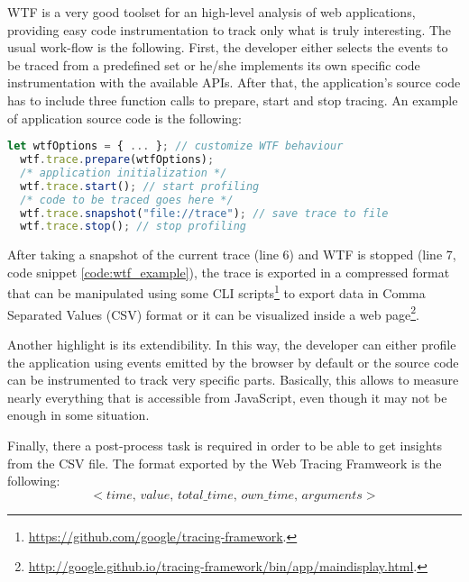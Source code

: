 WTF is a very good toolset for an high-level analysis of web applications,
providing easy code instrumentation to track only what is truly interesting.
The usual work-flow is the following. First, the developer either selects the events
to be traced from a predefined set or he/she implements its own specific code
instrumentation with the available APIs. After that, the application's source code
has to include three function calls to prepare, start and stop tracing.
An example of application source code is the following:
\begin{lstlisting}[caption=Usage example of the Web Tracing Framework., language=JavaScript,
  label=code:wtf_example]
  let wtfOptions = { ... }; // customize WTF behaviour
  wtf.trace.prepare(wtfOptions);
  /* application initialization */
  wtf.trace.start(); // start profiling
  /* code to be traced goes here */
  wtf.trace.snapshot("file://trace"); // save trace to file
  wtf.trace.stop(); // stop profiling
\end{lstlisting}

After taking a snapshot of the current trace (line 6) and WTF is stopped (line 7,
code snippet \ref{code:wtf_example}), the trace is exported in a
compressed format that can be manipulated using some CLI
scripts\footnote{\url{https://github.com/google/tracing-framework}.} to export
data in Comma Separated Values (CSV) format or it can be visualized inside a web
page\footnote{\url{http://google.github.io/tracing-framework/bin/app/maindisplay.html}.}.

Another highlight is its extendibility. In this way, the developer can either
profile the application using events emitted by the browser by default or the
source code can be instrumented to track very specific parts. Basically, this
allows to measure nearly everything that is accessible from JavaScript, even
though it may not be enough in some situation.

Finally, there a post-process task is required in order to be able to get
insights from the CSV file. The format exported by the Web Tracing Framweork
is the following:
\begin{equation*}
    <time,\,value,\,total\_time,\,own\_time,\,arguments>
\end{equation*}

